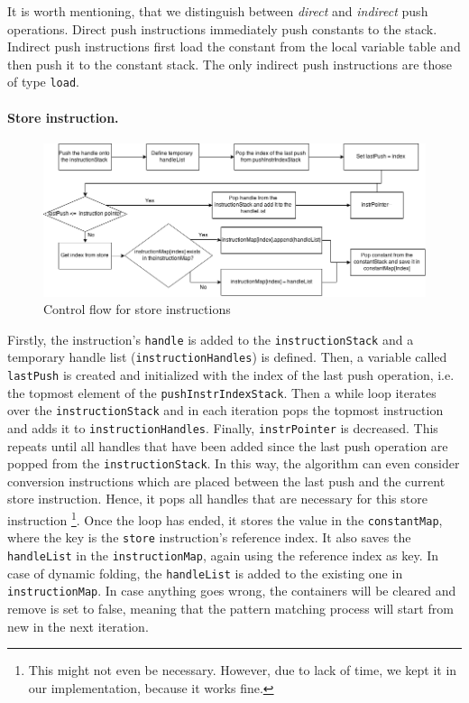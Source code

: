 It is worth mentioning, that we distinguish between \textit{direct} and \textit{indirect} push operations. Direct push instructions immediately push constants to the stack. Indirect push instructions first load the constant from the local variable table and then push it to the constant stack. The only indirect push instructions are those of type \texttt{load}.

\paragraph{Store instruction.}
\begin{figure}[h!]
\centering
\includegraphics[scale=0.5]{figures/store}
\caption{Control flow for store instructions}
\end{figure}

Firstly, the instruction’s \texttt{handle} is added to the \texttt{instructionStack} and a temporary handle list (\texttt{instructionHandles}) is defined. Then, a variable called \texttt{lastPush} is created and initialized with the index of the last push operation, i.e. the topmost element of the \texttt{pushInstrIndexStack}. Then a while loop iterates over the \texttt{instructionStack} and in each iteration pops the topmost instruction and adds it to \texttt{instructionHandles}. Finally, \texttt{instrPointer} is decreased. This repeats until all handles that have been added since the last push operation are popped from the \texttt{instructionStack}. 
In this way, the algorithm can even consider conversion instructions which are placed between the last push and the current store instruction. Hence, it pops all handles that are necessary for this store instruction \footnote{This might not even be necessary. However, due to lack of time, we kept it in our implementation, because it works fine.}. Once the loop has ended, it stores the value in the \texttt{constantMap}, where the key is the \texttt{store} instruction’s reference index. It also saves the \texttt{handleList} in the \texttt{instructionMap}, again using the reference index as key. In case of dynamic folding, the \texttt{handleList} is added to the existing one in \texttt{instructionMap}. In case anything goes wrong, the containers will be cleared and remove is set to false, meaning that the pattern matching process will start from new in the next iteration.

